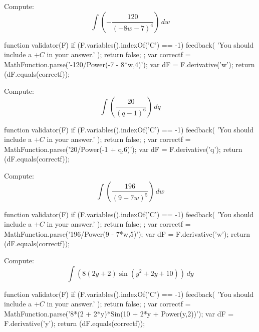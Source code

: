 \documentclass{ximera}
\renewcommand{\d}{\, d}
\begin{document}
\begin{exercise}
Compute: 
\[
\int \left(-\frac{120}{(-8 w-7)^4}\right)\d w
\]
\begin{expressionAnswer}
     function validator(F) {
      if (F.variables().indexOf('C') == -1) {
        feedback( 'You should include a $+C$ in your answer.' );
        return false;
      };      
      var correctf = MathFunction.parse('-120/Power(-7 - 8*w,4)');
      var dF = F.derivative('w');
      return (dF.equals(correctf));
    }
\end{expressionAnswer}
\end{exercise}



\begin{exercise}
Compute: 
\[
\int \left(\frac{20}{(q-1)^6}\right)\d q
\]
\begin{expressionAnswer}
     function validator(F) {
      if (F.variables().indexOf('C') == -1) {
        feedback( 'You should include a $+C$ in your answer.' );
        return false;
      };      
      var correctf = MathFunction.parse('20/Power(-1 + q,6)');
      var dF = F.derivative('q');
      return (dF.equals(correctf));
    }
\end{expressionAnswer}
\end{exercise}



\begin{exercise}
Compute: 
\[
\int \left(\frac{196}{(9-7 w)^5}\right)\d w
\]
\begin{expressionAnswer}
     function validator(F) {
      if (F.variables().indexOf('C') == -1) {
        feedback( 'You should include a $+C$ in your answer.' );
        return false;
      };      
      var correctf = MathFunction.parse('196/Power(9 - 7*w,5)');
      var dF = F.derivative('w');
      return (dF.equals(correctf));
    }
\end{expressionAnswer}
\end{exercise}



\begin{exercise}
Compute: 
\[
\int \left(8 (2 y+2) \sin \left(y^2+2 y+10\right)\right)\d y
\]
\begin{expressionAnswer}
     function validator(F) {
      if (F.variables().indexOf('C') == -1) {
        feedback( 'You should include a $+C$ in your answer.' );
        return false;
      };      
      var correctf = MathFunction.parse('8*(2 + 2*y)*Sin(10 + 2*y + Power(y,2))');
      var dF = F.derivative('y');
      return (dF.equals(correctf));
    }
\end{expressionAnswer}
\end{exercise}
\end{document}
